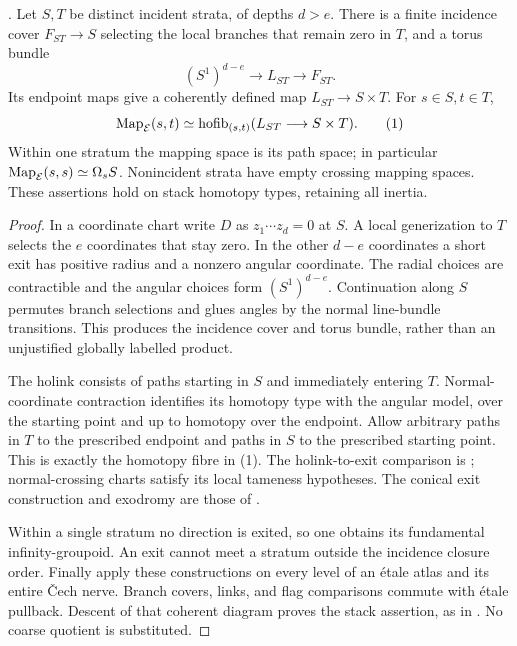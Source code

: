 \begin{theorem}\label{P1a1}
.
Let $S,T$ be distinct incident strata, of depths $d>e$.
There is a finite incidence cover $F_{ST}\to S$ selecting the local
branches that remain zero in $T$, and a torus bundle
\[
 (S^1)^{d-e}\longrightarrow L_{ST}\longrightarrow F_{ST}.
\]
Its endpoint maps give a coherently defined map $L_{ST}\to S\times T$.
For $s\in S,t\in T$,
\[
 \operatorname{Map}_{\mathcal E}(s,t)\simeq
 \operatorname{hofib}_{(s,t)}(L_{ST}\longrightarrow S\times T). \tag{1}
\]
Within one stratum the mapping space is its path space; in particular
$\operatorname{Map}_{\mathcal E}(s,s)\simeq\Omega_sS$.
Nonincident strata have empty crossing mapping spaces.
These assertions hold on stack homotopy types, retaining all inertia.
\end{theorem}
\begin{proof}
In a coordinate chart write $D$ as $z_1\cdots z_d=0$ at $S$.
A local generization to $T$ selects the $e$ coordinates that stay zero.
In the other $d-e$ coordinates a short exit has positive radius and a
nonzero angular coordinate. The radial choices are contractible and
the angular choices form $(S^1)^{d-e}$. Continuation along $S$
permutes branch selections and glues angles by the normal line-bundle
transitions. This produces the incidence cover and torus bundle,
rather than an unjustified globally labelled product.

The holink consists of paths starting in $S$ and immediately entering
$T$. Normal-coordinate contraction identifies its homotopy type with
the angular model, over the starting point and up to homotopy over
the endpoint. Allow arbitrary paths in $T$ to the prescribed endpoint
and paths in $S$ to the prescribed starting point. This is exactly
the homotopy fibre in (1). The holink-to-exit comparison is
\citet[Theorem 4.9]{Miller2009}; normal-crossing charts satisfy its
local tameness hypotheses. The conical exit construction and
exodromy are those of \citet[Appendix A.9]{LurieHA2017}.

Within a single stratum no direction is exited, so one obtains its
fundamental infinity-groupoid. An exit cannot meet a stratum outside
the incidence closure order. Finally apply these constructions on
every level of an étale atlas and its entire Čech nerve. Branch
covers, links, and flag comparisons commute with étale pullback.
Descent of that coherent diagram proves the stack assertion, as in
\citet[Proposition 3.16 and Corollary 3.17]{JansenToolbox2024}.
No coarse quotient is substituted.
\end{proof}

